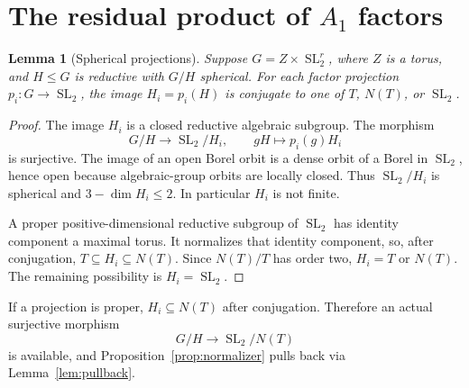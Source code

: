 \documentclass[11pt]{article}
\numberwithin{equation}{section}
\newtheorem{lemma}[theorem]{Lemma}
\theoremstyle{definition}
\theoremstyle{remark}
\DeclareMathOperator{\SL}{SL}
\begin{document}
\section{The residual product of \texorpdfstring{$A_1$}{A1} factors}\label{sec:structure}
\begin{lemma}[Spherical projections]\label{lem:projection}
Suppose $G=Z\times\SL_2^r$, where $Z$ is a torus, and $H\leq G$ is reductive with $G/H$ spherical. For each factor projection $p_i:G\to\SL_2$, the image $H_i=p_i(H)$ is conjugate to one of $T$, $N(T)$, or $\SL_2$.
\end{lemma}
\begin{proof}
The image $H_i$ is a closed reductive algebraic subgroup. The morphism
\[
 G/H\longrightarrow\SL_2/H_i,\qquad gH\longmapsto p_i(g)H_i
\]
is surjective. The image of an open Borel orbit is a dense orbit of a Borel in $\SL_2$, hence open because algebraic-group orbits are locally closed. Thus $\SL_2/H_i$ is spherical and $3-\dim H_i\leq2$. In particular $H_i$ is not finite.

A proper positive-dimensional reductive subgroup of $\SL_2$ has identity component a maximal torus. It normalizes that identity component, so, after conjugation, $T\subseteq H_i\subseteq N(T)$. Since $N(T)/T$ has order two, $H_i=T$ or $N(T)$. The remaining possibility is $H_i=\SL_2$.
\end{proof}

If a projection is proper, $H_i\subseteq N(T)$ after conjugation. Therefore an actual surjective morphism
\begin{equation}\label{eq:actualquotient}
 G/H\longrightarrow\SL_2/N(T)
\end{equation}
is available, and Proposition~\ref{prop:normalizer} pulls back via Lemma~\ref{lem:pullback}.
\end{document}
